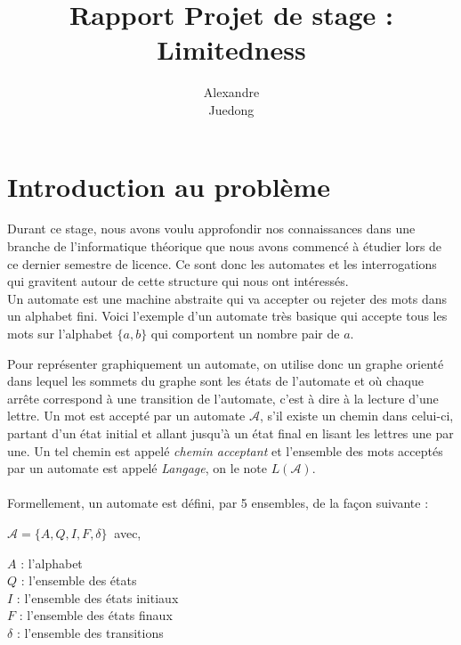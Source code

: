 \documentclass{report}
\title{\textbf{Rapport Projet de stage : Limitedness}}
\author{
\bsc {Brebant} Alexandre\\
\bsc {Xue} Juedong}
\begin{document}
\maketitle

\newcommand{\Aut}{\mathcal{A}}
\newcommand{\Ref}{\Aut_{ref}}
\newcommand{\N}{\mathbb{N}}
\newcommand{\R}{\mathcal{R}}

\tableofcontents
\chapter{Introduction au problème}
Durant ce stage, nous avons voulu approfondir nos connaissances dans une branche de l'informatique théorique que nous avons commencé à étudier lors de ce dernier semestre de licence. Ce sont donc les automates et les interrogations qui gravitent autour de cette structure qui nous ont intéressés.\\
Un automate est une machine abstraite qui va accepter ou rejeter des mots dans un alphabet fini. 
Voici l'exemple d'un automate très basique qui accepte tous les mots sur l'alphabet $\{a, b\}$ qui comportent un nombre pair de $a$.
\begin{center}
\end{center}

Pour représenter graphiquement un automate, on utilise donc un graphe orienté dans lequel les sommets du graphe sont les états de l'automate et où chaque arrête correspond à une transition de l'automate, c'est à dire à la lecture d'une lettre. Un mot est accepté par un automate $\Aut$, s'il existe un chemin dans celui-ci, partant d'un état initial et allant jusqu'à un état final en lisant les lettres une par une. Un tel chemin est appelé \textit{chemin acceptant} et l'ensemble des mots acceptés par un automate est appelé \textit{Langage}, on le note $L(\Aut)$.\\\\
Formellement, un automate est défini, par 5 ensembles, de la façon suivante :
\begin{center}
 $ \Aut = \{ A, Q, I, F, \delta \}\ $     avec,
 \end{center}
$A$ : l’alphabet\\
$Q$ : l'ensemble des états\\
$I$ : l'ensemble des états initiaux\\
$F$ : l'ensemble des états finaux\\
$\delta$ : l'ensemble des transitions\\
\end{document}
